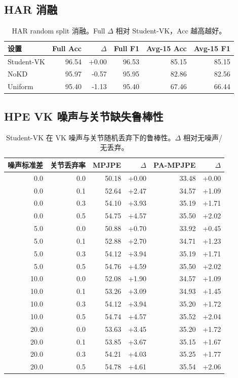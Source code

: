 \documentclass[UTF8,10pt]{ctexart}
\newcommand{\better}[1]{\textcolor{goodblue}{#1}}
\newcommand{\worse}[1]{\textcolor{badred}{#1}}
\begin{document}
\subsection{HAR 消融}
\begin{table}[H]\centering\scriptsize
\caption{HAR random split 消融。Full $\Delta$ 相对 Student-VK，Acc 越高越好。}
\begin{tabular}{lrrrrr}
\toprule
设置 & Full Acc & $\Delta$ & Full F1 & Avg-15 Acc & Avg-15 F1\\
\midrule
Student-VK & 96.54 & \better{+0.00} & 96.53 & 85.15 & 85.15\\
NoKD & 95.97 & \worse{-0.57} & 95.95 & 82.86 & 82.56\\
Uniform & 95.40 & \worse{-1.13} & 95.40 & 67.46 & 66.44\\
\bottomrule
\end{tabular}
\end{table}

\subsection{HPE VK 噪声与关节缺失鲁棒性}
\begin{table}[H]\centering\scriptsize
\caption{Student-VK 在 VK 噪声与关节随机丢弃下的鲁棒性。$\Delta$ 相对无噪声/无丢弃。}
\begin{tabular}{rrrrrr}
\toprule
噪声标准差 & 关节丢弃率 & MPJPE & $\Delta$ & PA-MPJPE & $\Delta$\\
\midrule
0.0 & 0.0 & 50.18 & \better{+0.00} & 33.48 & \better{+0.00}\\
0.0 & 0.1 & 52.64 & \worse{+2.47} & 34.57 & \worse{+1.09}\\
0.0 & 0.3 & 54.10 & \worse{+3.93} & 35.19 & \worse{+1.71}\\
0.0 & 0.5 & 54.75 & \worse{+4.57} & 35.50 & \worse{+2.02}\\
5.0 & 0.0 & 50.88 & \worse{+0.70} & 33.92 & \worse{+0.45}\\
5.0 & 0.1 & 52.88 & \worse{+2.70} & 34.71 & \worse{+1.23}\\
5.0 & 0.3 & 54.12 & \worse{+3.94} & 35.19 & \worse{+1.71}\\
5.0 & 0.5 & 54.76 & \worse{+4.59} & 35.50 & \worse{+2.02}\\
10.0 & 0.0 & 52.08 & \worse{+1.90} & 34.57 & \worse{+1.09}\\
10.0 & 0.1 & 53.26 & \worse{+3.09} & 34.93 & \worse{+1.45}\\
10.0 & 0.3 & 54.12 & \worse{+3.94} & 35.20 & \worse{+1.72}\\
10.0 & 0.5 & 54.74 & \worse{+4.57} & 35.52 & \worse{+2.04}\\
20.0 & 0.0 & 53.63 & \worse{+3.45} & 35.20 & \worse{+1.72}\\
20.0 & 0.1 & 53.85 & \worse{+3.67} & 35.15 & \worse{+1.67}\\
20.0 & 0.3 & 54.21 & \worse{+4.03} & 35.25 & \worse{+1.77}\\
20.0 & 0.5 & 54.78 & \worse{+4.61} & 35.54 & \worse{+2.06}\\
\bottomrule
\end{tabular}
\end{table}
\end{document}
